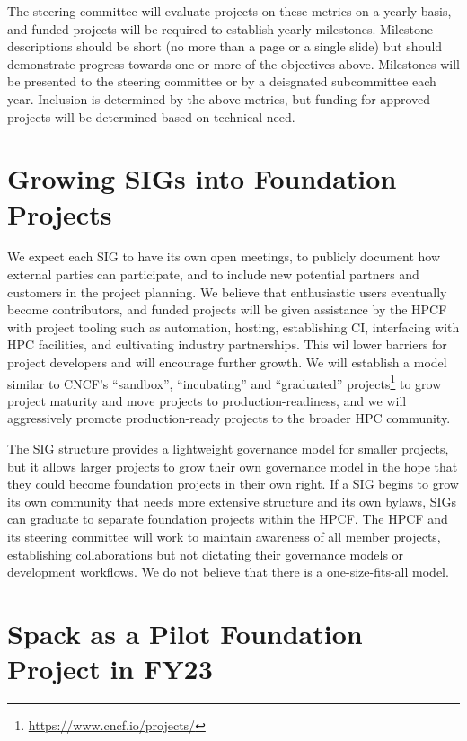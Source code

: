 \documentclass[11pt]{article}
\begin{document}
The steering committee will evaluate projects on these metrics on a yearly basis, and
funded projects will be required to establish yearly milestones. Milestone descriptions
should be short (no more than a page or a single slide) but should demonstrate progress
towards one or more of the objectives above. Milestones will be presented to the
steering committee or by a deisgnated subcommittee each year. Inclusion is determined by
the above metrics, but funding for approved projects will be determined based on
technical need.

\section{Growing SIGs into Foundation Projects}

We expect each SIG to have its own open meetings, to publicly document how external
parties can participate, and to include new potential partners and customers in the
project planning. We believe that enthusiastic users eventually become contributors, and
funded projects will be given assistance by the HPCF with project tooling such as
automation, hosting, establishing CI, interfacing with HPC facilities, and cultivating
industry partnerships. This wil lower barriers for project developers and will encourage
further growth. We will establish a model similar to CNCF's ``sandbox'', ``incubating''
and ``graduated''
projects\footnote{\href{https://www.cncf.io/projects/}{https://www.cncf.io/projects/}}
to grow project maturity and move projects to production-readiness, and we will
aggressively promote production-ready projects to the broader HPC community.

The SIG structure provides a lightweight governance model for smaller projects, but it
allows larger projects to grow their own governance model in the hope that they could
become foundation projects in their own right. If a SIG begins to grow its own community
that needs more extensive structure and its own bylaws, SIGs can graduate to separate
foundation projects within the HPCF. The HPCF and its steering committee will work to
maintain awareness of all member projects, establishing collaborations but not dictating
their governance models or development workflows. We do not believe that there is a
one-size-fits-all model.

\section{Spack as a Pilot Foundation Project in FY23}
\end{document}
